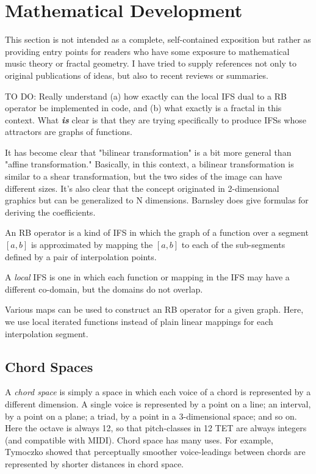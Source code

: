 \documentclass[english,11pt,letterpaper,onecolumn]{scrartcl}
\numberwithin{equation}{section}
\begin{document}
    \section{Mathematical Development}
    
    This section is not intended as a complete, self-contained exposition but 
    rather as providing entry points for readers who have some exposure to 
    mathematical music theory or fractal geometry. I have tried to supply 
    references not only to original publications of ideas, but also to recent 
    reviews or summaries.
    
    TO DO: Really understand (a) how exactly can the local IFS dual to a RB 
    operator be implemented in code, and (b) what exactly is a fractal in this 
    context. What \textit{\textbf{is}} clear is that they are trying specifically 
    to produce IFSs whose attractors are graphs of functions.
    
    It has become clear that "bilinear transformation" is a bit more general than 
    "affine transformation." Basically, in this context, a bilinear transformation 
    is similar to a shear transformation, but the two sides of the image can have 
    different sizes. It's also clear that the concept originated in 2-dimensional 
    graphics but can be generalized to N dimensions. Barnsley does give formulas for 
    deriving the coefficients.
    
    An RB operator is a kind of IFS in which the graph of a function over a 
segment 
    $[a, b]$ is approximated by mapping the $[a, b]$ to each of the 
sub-segments 
    defined by a pair of interpolation points.
    
    A \textit{local} IFS is one in which each function or mapping in the IFS 
    may have a different co-domain, but the domains do not overlap.
    
    Various maps can be used to construct an RB operator for a given graph. Here, 
    we use local iterated functions instead of plain linear mappings for each 
    interpolation segment.
    
    \subsection{Chord Spaces}
    
    A \textit{chord space} is simply a space in which each voice of a chord is 
    represented by a different dimension. A single voice is represented by a 
point 
    on a line; an interval, by a point on a plane; a triad, by a point in a 
    3-dimensional space; and so on. Here the octave is always 12, so that 
    pitch-classes in 12 TET are always integers (and compatible with MIDI). 
Chord 
    space has many uses. For example, Tymoczko \cite{tymoczko2006geometry, 
        tymoczko2011geometry} showed that perceptually smoother voice-leadings 
between 
    chords are represented by shorter distances in chord space. 
    
\end{document}
